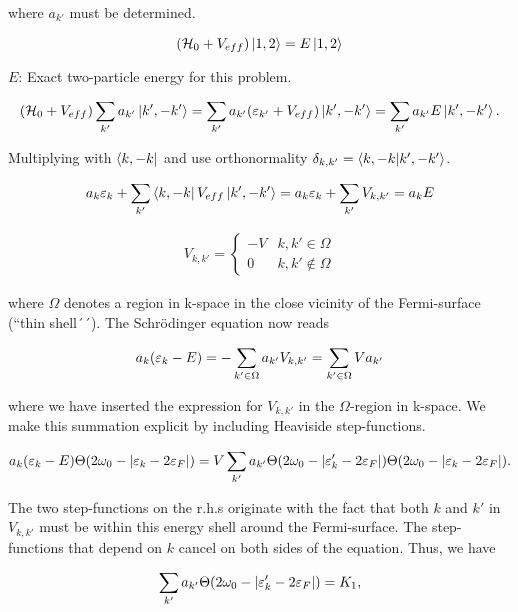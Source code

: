 where $a_{k'}$ must be determined. 

\begin{equation}
(\mathcal{H}_0 + V_{eff})\ket{1,2} = E\ket{1,2}
\end{equation}

$E$: Exact two-particle energy for this problem. 

\begin{align*}
(\mathcal{H}_0 + V_{eff})\sum_{k'} a_{k'}\ket{k', -k'} = \sum_{k'} a_{k'}(\varepsilon_{k'} + V_{eff})\ket{k', -k'} = \sum_{k'} a_{k'}E\ket{k', -k'}.
\end{align*}

Multiplying with $\bra{k,-k}$ and use orthonormality $\delta_{k,k'} = \braket{k,-k}{k',-k'}$. 

\begin{align*}
a_k \varepsilon_k + \sum_{k'} \bra{k, -k} V_{eff} \ket{k', -k'} = a_k \varepsilon_k + \sum_{k'} V_{k,k'} = a_k E
\end{align*}

\begin{align*}
V_{k,k'} = \begin{cases} -V & k,k' \in \Omega \\
0 & k,k' \notin \Omega \end{cases} 
\end{align*}

where $\Omega$ denotes a region in k-space in the close vicinity of the Fermi-surface (``thin shell´´). The Schrödinger equation now reads 

\begin{align*}
a_k(\varepsilon_k - E) = -\sum_{k' \in \Omega}a_{k'}V_{k,k'} = \sum_{k' \in \Omega}V a_{k'}
\end{align*}

where we have inserted the expression for $V_{k,k'}$ in the $\Omega$-region in k-space. We make this summation explicit by including Heaviside step-functions. 

\begin{align*}
a_k (\varepsilon_k - E) \Theta(2\omega_0 - \abs{\varepsilon_k - 2\varepsilon_F}) = V \sum_{k'} a_{k'} \Theta(2\omega_0 - \abs{\varepsilon_k' - 2\varepsilon_F}) \Theta(2\omega_0 - \abs{\varepsilon_k - 2\varepsilon_F}).
\end{align*}

The two step-functions on the r.h.s originate with the fact that both $k$ and $k'$ in $V_{k,k'}$ must be within this energy shell around the Fermi-surface. The step-functions that depend on $k$ cancel on both sides of the equation. Thus, we have 

\begin{align*}
\sum_{k'} a_{k'} \Theta(2\omega_0 - \abs{\varepsilon_k' - 2\varepsilon_F}) = K_1, 
\end{align*}

